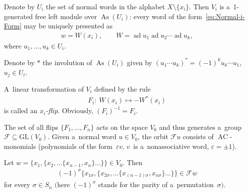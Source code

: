 \documentclass[pdftex]{sigma}
\DeclareMathOperator{\ad}{ad}
\begin{document}
Denote by $U_i$ the set of normal words in the alphabet $X\setminus \{x_i\} $.
Then $V_i$ is a~1-generated free left module over $\operatorname{As}(U_i)$: every word of the form~\eqref{eq:Normal-i-Form} may be
uniquely presented as
\begin{gather*}
w = W(x_i),
\qquad
W=\ad u_1 \ad u_2 \cdots \ad u_k,
\end{gather*}
where $u_1,\dots, u_k \in U_i$.

Denote by $*$ the involution of $\operatorname{As}(U_i)$ given by $(u_1\cdots u_k)^* = (-1)^{k}u_k\cdots u_1$, $u_j\in U_i$.

\begin{definition}
\label{defn:x_i-flip}
A~linear transformation of $V_i$ def\/ined by the rule
\begin{gather*}
F_i: \ W(x_i) \mapsto -W^*(x_i)
\end{gather*}
is called an {\em $x_i$-flip}.
Obviously, $(F_i)^{-1}=F_i$.
\end{definition}

The set of all f\/lips $\{F_1,\dots, F_n\}$ acts on the space $V_0$ and thus generates a~group $\mathcal F\subseteq
\mathrm{GL}(V_0)$.
Given a~normal word $u\in V_0$, the orbit $\mathcal Fu$ consists of $\operatorname{AC}$-monomials (polynomials of the form~$\varepsilon v$, $v$~is a~nonassociative word, $\varepsilon =\pm 1$).

\begin{lemma}
\label{lem:FlipsGenerateS_n}
Let $w = \{x_1,\{x_2, \dots \{x_{n-1},x_n\}\dots \}\}\in V_0$.
Then
\begin{gather*}
(-1)^\sigma \{x_{1\sigma},\{x_{2\sigma}, \dots \{x_{(n-1)\sigma},x_{n\sigma}\}\dots \}\}\in \mathcal Fw
\end{gather*}
for every $\sigma \in S_n$ $($here $(-1)^\sigma $ stands for the parity of a~permutation~$\sigma)$.
\end{lemma}
\end{document}
